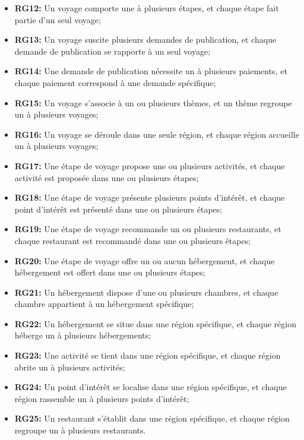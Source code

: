 \documentclass[12pt]{report}
\begin{document}
\begin{itemize}
			    \item \textbf{RG12:} Un voyage comporte une à plusieurs étapes, et chaque étape fait partie d'un seul voyage;
			    \item \textbf{RG13:} Un voyage suscite plusieurs demandes de publication, et chaque demande de publication se rapporte à un seul voyage;
			    \item \textbf{RG14:} Une demande de publication nécessite un à plusieurs paiements, et chaque paiement correspond à une demande spécifique;
			    \item \textbf{RG15:} Un voyage s'associe à un ou plusieurs thèmes, et un thème regroupe un à plusieurs voyages;
			    \item \textbf{RG16:} Un voyage se déroule dans une seule région, et chaque région accueille un à plusieurs voyages;
			    \item \textbf{RG17:} Une étape de voyage propose une ou plusieurs activités, et chaque activité est proposée dans une ou plusieurs étapes;
			    \item \textbf{RG18:} Une étape de voyage présente plusieurs points d'intérêt, et chaque point d'intérêt est présenté dans une ou plusieurs étapes;
			    \item \textbf{RG19:} Une étape de voyage recommande un ou plusieurs restaurants, et chaque restaurant est recommandé dans une ou plusieurs étapes;
			    \item \textbf{RG20:} Une étape de voyage offre un ou aucun hébergement, et chaque hébergement est offert dans une ou plusieurs étapes;
			    \item \textbf{RG21:} Un hébergement dispose d'une ou plusieurs chambres, et chaque chambre appartient à un hébergement spécifique;
			    \item \textbf{RG22:} Un hébergement se situe dans une région spécifique, et chaque région héberge un à plusieurs hébergements;
			    \item \textbf{RG23:} Une activité se tient dans une région spécifique, et chaque région abrite un à plusieurs activités;
			    \item \textbf{RG24:} Un point d'intérêt se localise dans une région spécifique, et chaque région rassemble un à plusieurs points d'intérêt;
			    \item \textbf{RG25:} Un restaurant s'établit dans une région spécifique, et chaque région regroupe un à plusieurs restaurants.
			\end{itemize}
\end{document}
